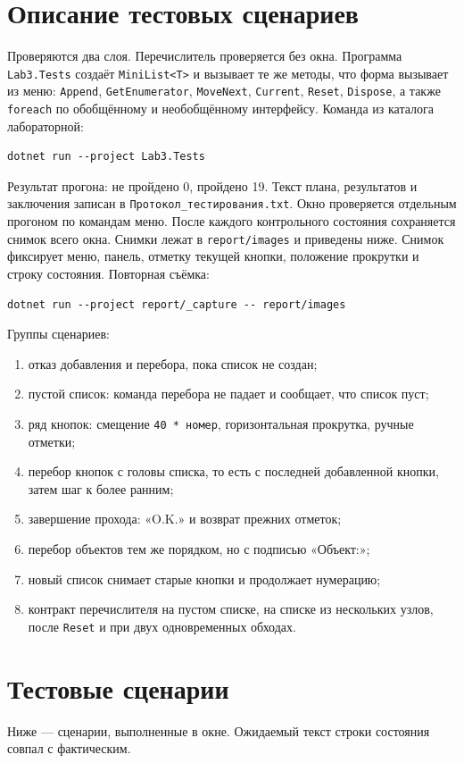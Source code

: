 \documentclass[a4paper,14pt]{extarticle}
\begin{document}
\section{Описание тестовых сценариев}
Проверяются два слоя.
Перечислитель проверяется без окна. Программа \texttt{Lab3.Tests} создаёт \texttt{MiniList<T>} и вызывает те же методы, что форма вызывает из меню: \texttt{Append}, \texttt{GetEnumerator}, \texttt{MoveNext}, \texttt{Current}, \texttt{Reset}, \texttt{Dispose}, а также \texttt{foreach} по обобщённому и необобщённому интерфейсу. Команда из каталога лабораторной:
\begin{lstlisting}[style=cmd]
dotnet run --project Lab3.Tests
\end{lstlisting}
Результат прогона: не пройдено 0, пройдено 19. Текст плана, результатов и заключения записан в \texttt{Протокол\_тестирования.txt}.
Окно проверяется отдельным прогоном по командам меню. После каждого контрольного состояния сохраняется снимок всего окна. Снимки лежат в \texttt{report/images} и приведены ниже. Снимок фиксирует меню, панель, отметку текущей кнопки, положение прокрутки и строку состояния.
Повторная съёмка:
\begin{lstlisting}[style=cmd]
dotnet run --project report/_capture -- report/images
\end{lstlisting}
Группы сценариев:
\begin{enumerate}
\item отказ добавления и перебора, пока список не создан;
\item пустой список: команда перебора не падает и сообщает, что список пуст;
\item ряд кнопок: смещение \texttt{40 * номер}, горизонтальная прокрутка, ручные отметки;
\item перебор кнопок с головы списка, то есть с последней добавленной кнопки, затем шаг к более ранним;
\item завершение прохода: «O.K.» и возврат прежних отметок;
\item перебор объектов тем же порядком, но с подписью «Объект:»;
\item новый список снимает старые кнопки и продолжает нумерацию;
\item контракт перечислителя на пустом списке, на списке из нескольких узлов, после \texttt{Reset} и при двух одновременных обходах.
\end{enumerate}
\section{Тестовые сценарии}
Ниже — сценарии, выполненные в окне. Ожидаемый текст строки состояния совпал с фактическим.
\end{document}
